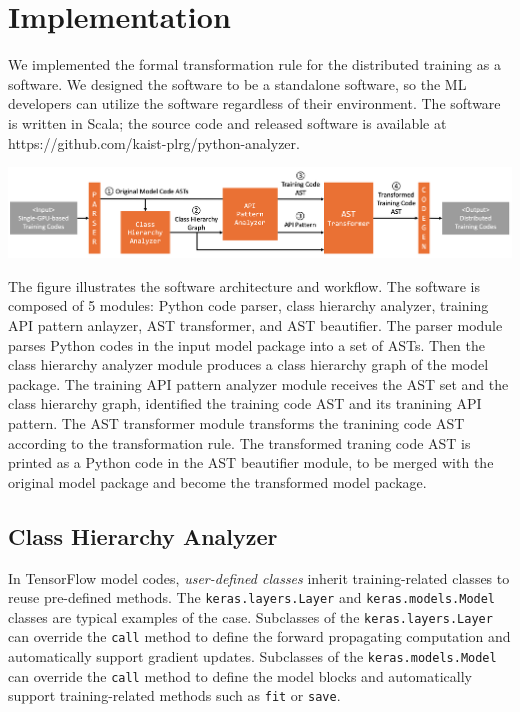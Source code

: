 \section{Implementation}\label{sec:impl}


We implemented the formal transformation rule for the distributed training
as a software. We designed the software to be a standalone software, so 
the ML developers can utilize the software regardless of their environment. 
The software is written in Scala; the source code and released software
is available at https://github.com/kaist-plrg/python-analyzer. 

\includegraphics[width=15cm]{system_arch}

The figure illustrates the software architecture and workflow.
The software is composed of 5 modules:
Python code parser, class hierarchy analyzer,
training API pattern anlayzer, AST transformer, and AST beautifier.
The parser module parses Python codes in the input model package into 
a set of ASTs. Then the class hierarchy analyzer module 
produces a class hierarchy graph of the model package.
The training API pattern analyzer module receives the AST set and
the class hierarchy graph, identified the training code AST and
its tranining API pattern. The AST transformer module
transforms the tranining code AST according to the transformation rule.
The transformed traning code AST is printed as a Python code in the
AST beautifier module, to be merged with the original model package
and become the transformed model package.

\subsection{Class Hierarchy Analyzer}

In TensorFlow model codes, \textit{user-defined classes} inherit
training-related classes to reuse pre-defined methods.
The {\tt keras.layers.Layer} and {\tt keras.models.Model} classes 
are typical examples of the case.
Subclasses of the {\tt keras.layers.Layer} can override
the {\tt call} method to define the forward propagating computation
and automatically support gradient updates.
Subclasses of the {\tt keras.models.Model} can override
the {\tt call} method to define the model blocks
and automatically support training-related methods
such as {\tt fit} or {\tt save}. 

